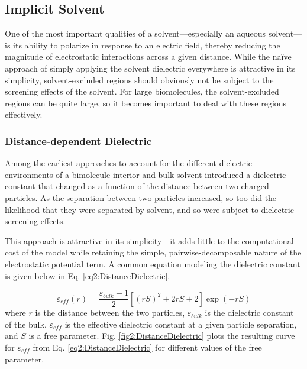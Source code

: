 \subsection{Implicit Solvent}

One of the most important qualities of a solvent---especially an aqueous
solvent---is its ability to polarize in response to an electric field, thereby
reducing the magnitude of electrostatic interactions across a given distance.
While the na\"ive approach of simply applying the solvent dielectric everywhere
is attractive in its simplicity, solvent-excluded regions should obviously not
be subject to the screening effects of the solvent. For large biomolecules, the
solvent-excluded regions can be quite large, so it becomes important to deal
with these regions effectively.

\subsubsection{Distance-dependent Dielectric}

Among the earliest approaches to account for the different dielectric
environments of a bimolecule interior and bulk solvent introduced a dielectric
constant that changed as a function of the distance between two charged
particles. As the separation between two particles increased, so too did the
likelihood that they were separated by solvent, and so were subject to
dielectric screening effects.

This approach is attractive in its simplicity---it adds little to the
computational cost of the model while retaining the simple,
pairwise-decomposable nature of the electrostatic potential term. A common
equation modeling the dielectric constant is given below in Eq.
\ref{eq2:DistanceDielectric}. \cite{Leach_Book_MolModel_2001}

\begin{equation}
   \varepsilon _ {eff} (r) = \frac {\varepsilon_{bulk} - 1} 2 \left [ (rS) ^2 +
   2rS + 2 \right ] \exp(-rS)
   \label{eq2:DistanceDielectric}
\end{equation}
where $r$ is the distance between the two particles, $\varepsilon_{bulk}$ is the
dielectric constant of the bulk, $\varepsilon_{eff}$ is the effective
dielectric constant at a given particle separation, and $S$ is a free parameter.
Fig. \ref{fig2:DistanceDielectric} plots the resulting curve for
$\varepsilon_{eff}$ from Eq. \ref{eq2:DistanceDielectric} for different values
of the free parameter.

